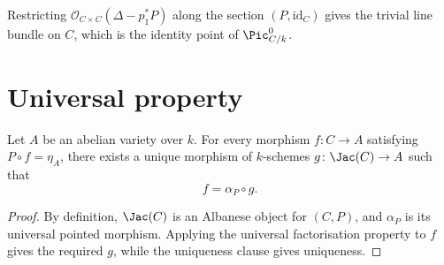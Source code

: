 \begin{remark}
  \label{rem:comp_ofCurve_classical}
  Restricting \(\mathcal O_{C\times C}(\Delta-p_1^*P)\) along the section
  \((P,\mathrm{id}_C)\) gives the trivial line bundle on \(C\), which is the
  identity point of \(\Pic^0_{C/k}\).
\end{remark}

\section{Universal property}

\begin{theorem}\leanok
  \label{thm:exists_unique_ofCurve_comp}
  Let \(A\) be an abelian variety over \(k\).  For every morphism
  \(f \colon C \to A\) satisfying \(P \circ f = \eta_A\), there exists a
  unique morphism of \(k\)-schemes \(g \colon \Jac(C) \to A\) such that
  \[
    f = \alpha_P \circ g.
  \]
\end{theorem}

\begin{proof}
  By definition, \(\Jac(C)\) is an Albanese object for \((C,P)\), and
  \(\alpha_P\) is its universal pointed morphism.  Applying the universal
  factorisation property to \(f\) gives the required \(g\), while the
  uniqueness clause gives uniqueness.
\end{proof}
